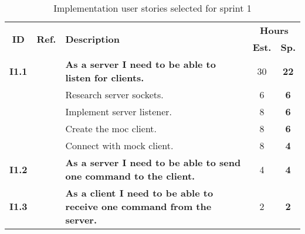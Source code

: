 \def\arraystretch{1.25}
\begin{longtable}{ccXcc}
\label{tab:sprint1stories}\\[-6mm]
\caption{Implementation user stories selected for sprint 1}\\[-4mm]
\toprule[0.5mm]
\multirow{2}{*}{\textbf{ID}} &
\multirow{2}{*}{\textbf{Ref.}} & \multirow{2}{*}{\textbf{Description}} & \multicolumn{2}{c}{\textbf{Hours}} \\
 					& & & \textbf{Est.} & \textbf{Sp.} \\
\midrule

	
\textbf{I1.1} 	& {C1}	& {\bf As a server I need to be able to listen for clients.} 							& 	30	& \textbf{22} \\
				&& Research server sockets.		& 6 & \textbf{6} \\
				&& Implement server listener.	& 8 & \textbf{6} \\
				&& Create the moc client. 		& 8 & \textbf{6}  \\
				&& Connect with mock client.	& 8 & \textbf{4}  \\
	
\textbf{I1.2} 	& {M6}	& {\bf As a server I need to be able to send one command to the client. } 				& 	4	& \textbf{4} \\

\textbf{I1.3} 	& {M6}	& {\bf As a client I need to be able to receive one command from the server. } 			& 	2	& \textbf{2} \\


\end{longtable}
